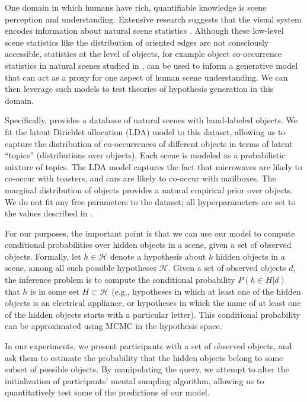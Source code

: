 One domain in which humans have rich, quantifiable knowledge is scene perception and understanding. Extensive research suggests that the visual system encodes information about natural scene statistics \citep{barlow2001exploitation,simoncelli2001natural}.
Although these low-level scene statistics like the distribution of oriented edges are not consciously accessible, statistics at the level of objects, for example object co-occurrence statistics in natural scenes studied in \citet{greene13}, can be used to inform a generative model that can act as a proxy for one aspect of human scene understanding. We can then leverage such models to test theories of hypothesis generation in this domain.

Specifically, \citet{greene13} provides a database of natural scenes with hand-labeled objects. We fit the latent Dirichlet allocation (LDA) model \citep{blei2003latent} to this dataset, allowing us to capture the distribution of co-occurrences of different objects in terms of latent ``topics'' (distributions over objects). Each scene is modeled as a probabilistic mixture of topics. The LDA model captures the fact that microwaves are likely to co-occur with toasters, and cars are likely to co-occur with mailboxes. The marginal distribution of objects provides a natural empirical prior over objects. We do not fit any free parameters to the dataset; all hyperparameters are set to the values described in \citet{blei2003latent}.


For our purposes, the important point is that we can use our model to compute conditional probabilities over hidden objects in a scene, given a set of observed objects. Formally, let $h \in \mathcal{H}$ denote a hypothesis about $k$ hidden objects in a scene, among all such possible hypotheses $\mathcal{H}$. Given a set of observed objects $d$, the inference problem is to compute the conditional probability $P(h \in H|d)$ that $h$ is in some set $H \subset \mathcal{H}$ (e.g., hypotheses in which at least one of the hidden objects is an electrical appliance, or hypotheses in which the name of at least one of the hidden objects starts with a particular letter). This conditional probability can be approximated using MCMC in the hypothesis space.

In our experiments, we present participants with a set of observed objects, and ask them to estimate the probability that the hidden objects belong to some subset of possible objects. By manipulating the query, we attempt to alter the initialization of participants' mental sampling algorithm, allowing us to quantitatively test some of the predictions of our model. 

